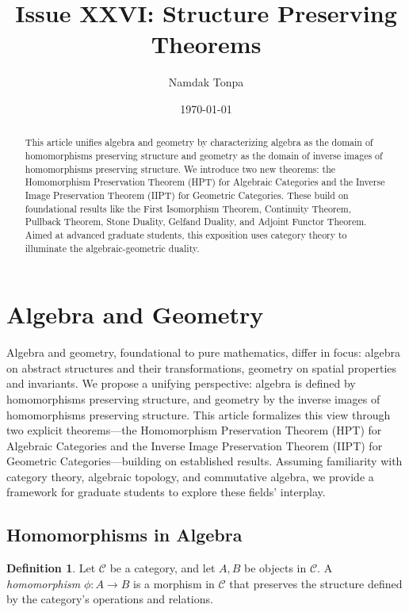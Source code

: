 \documentclass{article}
\theoremstyle{plain}
\theoremstyle{definition}
\newtheorem{definition}{Definition}
\begin{document}
\title{Issue XXVI: Structure Preserving Theorems}
\author{Namdak Tonpa}
\date{\today}


\maketitle

\begin{abstract}
This article unifies algebra and geometry by characterizing algebra
as the domain of homomorphisms preserving structure and geometry as
the domain of inverse images of homomorphisms preserving structure.
We introduce two new theorems: the Homomorphism Preservation Theorem
(HPT) for Algebraic Categories and the Inverse Image Preservation
Theorem (IIPT) for Geometric Categories. These build on foundational
results like the First Isomorphism Theorem, Continuity Theorem,
Pullback Theorem, Stone Duality, Gelfand Duality, and Adjoint Functor
Theorem. Aimed at advanced graduate students, this exposition uses
category theory to illuminate the algebraic-geometric duality.
\end{abstract}


\ifincludeTOC
  \tableofcontents
\fi


\section{Algebra and Geometry}
Algebra and geometry, foundational to pure mathematics,
differ in focus: algebra on abstract structures and their
transformations, geometry on spatial properties and invariants.
We propose a unifying perspective: algebra is defined by homomorphisms
preserving structure, and geometry by the inverse images of
homomorphisms preserving structure. This article formalizes
this view through two explicit theorems—the Homomorphism
Preservation Theorem (HPT) for Algebraic Categories and
the Inverse Image Preservation Theorem (IIPT) for Geometric
Categories—building on established results. Assuming familiarity
with category theory, algebraic topology, and commutative algebra,
we provide a framework for graduate students to explore these fields’ interplay.

\subsection{Homomorphisms in Algebra}
\begin{definition}
Let \(\mathcal{C}\) be a category, and let \(A, B\) be objects in \(\mathcal{C}\). A \emph{homomorphism} \(\phi: A \to B\) is a morphism in \(\mathcal{C}\) that preserves the structure defined by the category’s operations and relations.
\end{definition}
\end{document}
